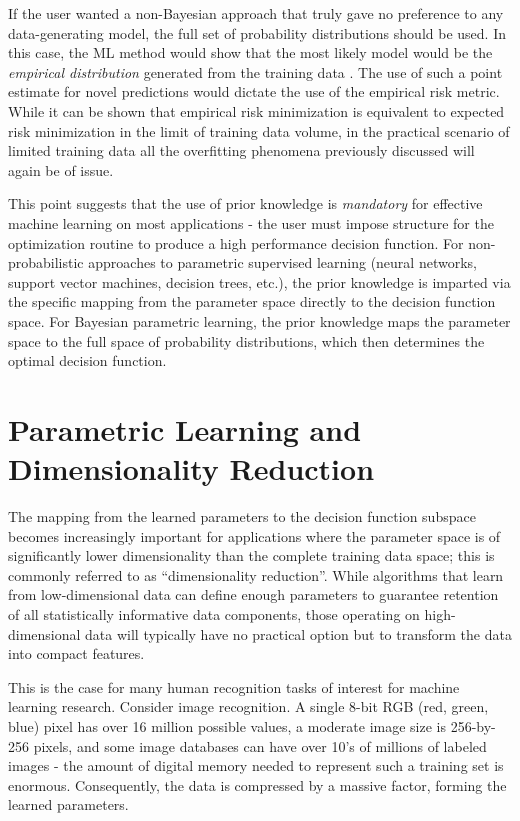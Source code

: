 \documentclass[12pt]{report}
\begin{document}
If the user wanted a non-Bayesian approach that truly gave no preference to any data-generating model, the full set of probability distributions should be used. In this case, the ML method would show that the most likely model would be the \emph{empirical distribution} generated from the training data \cite{rao}. The use of such a point estimate for novel predictions would dictate the use of the empirical risk metric. While it can be shown that empirical risk minimization is equivalent to expected risk minimization in the limit of training data volume, in the practical scenario of limited training data all the overfitting phenomena previously discussed will again be of issue. 

This point suggests that the use of prior knowledge is \emph{mandatory} for effective machine learning on most applications - the user must impose structure for the optimization routine to produce a high performance decision function. For non-probabilistic approaches to parametric supervised learning (neural networks, support vector machines, decision trees, etc.), the prior knowledge is imparted via the specific mapping from the parameter space directly to the decision function space. For Bayesian parametric learning, the prior knowledge maps the parameter space to the full space of probability distributions, which then determines the optimal decision function. 


\section{Parametric Learning and Dimensionality Reduction}

The mapping from the learned parameters to the decision function subspace becomes increasingly important for applications where the parameter space is of significantly lower dimensionality than the complete training data space; this is commonly referred to as ``dimensionality reduction''. While algorithms that learn from low-dimensional data can define enough parameters to guarantee retention of all statistically informative data components, those operating on high-dimensional data will typically have no practical option but to transform the data into compact features. 

This is the case for many human recognition tasks of interest for machine learning research. Consider image recognition. A single 8-bit RGB (red, green, blue) pixel has over 16 million possible values, a moderate image size is 256-by-256 pixels, and some image databases can have over 10's of millions of labeled images - the amount of digital memory needed to represent such a training set is enormous. Consequently, the data is compressed by a massive factor, forming the learned parameters. 
\end{document}
